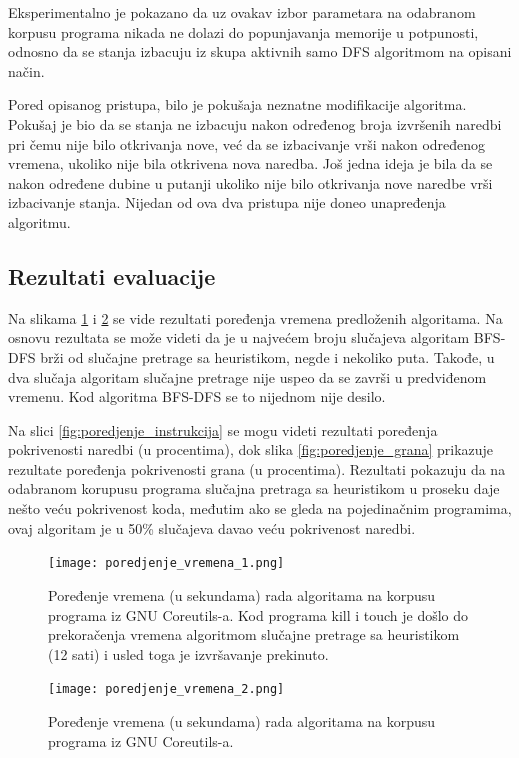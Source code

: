 \documentclass[12pt,oneside]{memoir}
\begin{document}
Eksperimentalno je pokazano da uz ovakav izbor parametara na odabranom korpusu programa nikada ne dolazi do popunjavanja memorije u potpunosti, odnosno da se stanja izbacuju iz skupa aktivnih samo DFS algoritmom na opisani način.

Pored opisanog pristupa, bilo je pokušaja neznatne modifikacije algoritma. Pokušaj je bio da se stanja ne izbacuju nakon određenog broja izvršenih naredbi pri čemu nije bilo otkrivanja nove, već da se izbacivanje vrši nakon određenog vremena, ukoliko nije bila otkrivena nova naredba. Još jedna ideja je bila da se nakon određene dubine u putanji ukoliko nije bilo otkrivanja nove naredbe vrši izbacivanje stanja. Nijedan od ova dva pristupa nije doneo unapređenja algoritmu.

\subsection{Rezultati evaluacije}

Na slikama \ref{fig:poredjenje_vemena_1} i \ref{fig:poredjenje_vemena_2} se vide rezultati poređenja vremena predloženih algoritama. Na osnovu rezultata se može videti da je u najvećem broju slučajeva algoritam BFS-DFS brži od slučajne pretrage sa heuristikom, negde i nekoliko puta. Takođe, u dva slučaja algoritam slučajne pretrage nije uspeo da se završi u predviđenom vremenu. Kod algoritma BFS-DFS se to nijednom nije desilo. 

Na slici \ref{fig:poredjenje_instrukcija} se mogu videti rezultati poređenja pokrivenosti naredbi (u procentima), dok slika \ref{fig:poredjenje_grana} prikazuje rezultate poređenja pokrivenosti grana (u procentima). Rezultati pokazuju da na odabranom korupusu programa slučajna pretraga sa heuristikom u proseku daje nešto veću pokrivenost koda, međutim ako se gleda na pojedinačnim programima, ovaj algoritam je u 50\% slučajeva davao veću pokrivenost naredbi.

\begin{figure}[H]
    \centering
    \texttt{[image: poredjenje\_vremena\_1.png]}
    \caption{Poređenje vremena (u sekundama) rada algoritama na korpusu programa iz GNU Coreutils-a. Kod programa kill i touch je došlo do prekoračenja vremena algoritmom slučajne pretrage sa heuristikom (12 sati) i usled toga je izvršavanje prekinuto.}
    \label{fig:poredjenje_vemena_1}
\end{figure}

\begin{figure}[H]
    \centering
    \texttt{[image: poredjenje\_vremena\_2.png]}
    \caption{Poređenje vremena (u sekundama) rada algoritama na korpusu programa iz GNU Coreutils-a.}
    \label{fig:poredjenje_vemena_2}
\end{figure}
\end{document}
